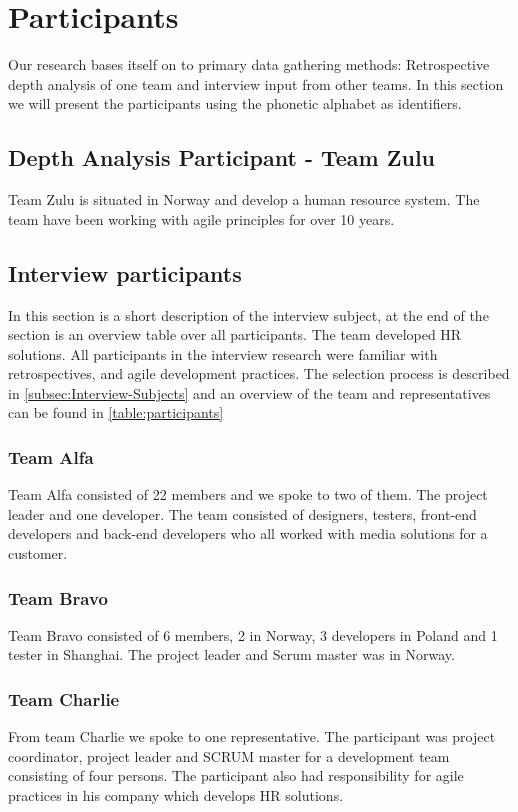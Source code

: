 \section{Participants}
Our research bases itself on to primary data gathering methods: Retrospective depth analysis of one team and interview input from other teams. In this section we will present the participants using the phonetic alphabet as identifiers. 

\subsection{Depth Analysis Participant - Team Zulu}
\label{section:team-zulu-description}
Team Zulu is situated in Norway and develop a human resource system. The team have been working with agile principles for over 10 years.  

\subsection{Interview participants}
In this section is a short description of the interview subject, at the end of the section is an overview table over all participants. The team developed HR solutions. All participants in the interview research were familiar with retrospectives, and agile development practices. The selection process is described in \autoref{subsec:Interview-Subjects} and an overview of the team and representatives can be found in \autoref{table:participants}

\subsubsection{Team Alfa}
Team Alfa consisted of 22 members and we spoke to two of them. The project leader and one developer. The team consisted of designers, testers, front-end developers and back-end developers who all worked with media solutions for a customer. 

\subsubsection{Team Bravo}
Team Bravo consisted of 6 members, 2 in Norway, 3 developers in Poland and 1 tester in Shanghai. The project leader and  Scrum master was in Norway. 

\subsubsection{Team Charlie}
From team Charlie we spoke to one representative. The participant was project coordinator, project leader and SCRUM master for a development team consisting of four persons. The participant also had responsibility for agile practices in his company which develops HR solutions. 

